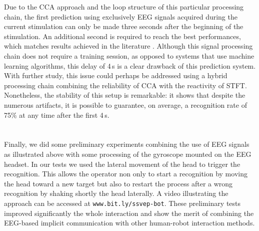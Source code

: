 \documentclass[smallextended]{svjour3}
\begin{document}
Due to the CCA approach and the loop structure of this particular processing chain, the first prediction using exclusively EEG signals acquired during the current stimulation can only be made three seconds after the beginning of the stimulation.
An additional second is required to reach the best performances, which matches results achieved in the literature \cite{Fan2015,SSVEPfiability,jian2014improving,paper4}. 
Although this signal processing chain does not require a training session, as opposed to systems that use machine learning algorithms, this delay of 4\,s is a clear drawback of this prediction system. 
With further study, this issue could perhaps be addressed using a hybrid processing chain combining the reliability of CCA with the reactivity of STFT.
Nonetheless, the stability of this setup is remarkable: it shows that despite the numerous artifacts, it is possible to guarantee, on average, a recognition rate of 75\% at any time after the first 4\,s. \\
\\
\\
Finally, we did some preliminary experiments combining the use of EEG signals as illustrated above with some processing of the gyroscope mounted on the EEG headset. 
In our tests we used the lateral movement of the head to trigger the recognition. 
This allows the operator non only to start a recognition by moving the head toward a new target but also to restart the process after a wrong recognition by shaking shortly the head laterally. 
A video illustrating the approach can be accessed at \verb"www.bit.ly/ssvep-bot". 
These preliminary tests improved significantly the whole interaction and show the merit of combining the EEG-based implicit communication with other human-robot interaction methods.
\end{document}
